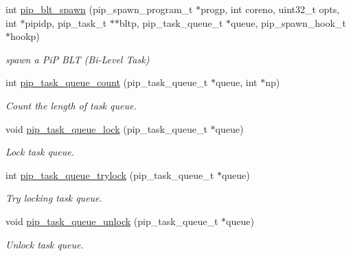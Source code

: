 \begin{DoxyCompactItemize}
\item 
int \hyperlink{group__libpip_gaceaa2ec686f001439d6ea89d47e71f65}{pip\-\_\-blt\-\_\-spawn} (pip\-\_\-spawn\-\_\-program\-\_\-t $\ast$progp, int coreno, uint32\-\_\-t opts, int $\ast$pipidp, pip\-\_\-task\-\_\-t $\ast$$\ast$bltp, pip\-\_\-task\-\_\-queue\-\_\-t $\ast$queue, pip\-\_\-spawn\-\_\-hook\-\_\-t $\ast$hookp)
\begin{DoxyCompactList}\small\item\em spawn a Pi\-P B\-L\-T (Bi-\/\-Level Task) \end{DoxyCompactList}\end{DoxyCompactItemize}
\begin{DoxyCompactItemize}
\item 
int \hyperlink{group__libpip_ga5a043af776eb89933bfc0a057790cc82}{pip\-\_\-task\-\_\-queue\-\_\-count} (pip\-\_\-task\-\_\-queue\-\_\-t $\ast$queue, int $\ast$np)
\begin{DoxyCompactList}\small\item\em Count the length of task queue. \end{DoxyCompactList}\end{DoxyCompactItemize}
\begin{DoxyCompactItemize}
\item 
void \hyperlink{group__libpip_gaf7f6e26e29752a148704108bdcc7756f}{pip\-\_\-task\-\_\-queue\-\_\-lock} (pip\-\_\-task\-\_\-queue\-\_\-t $\ast$queue)
\begin{DoxyCompactList}\small\item\em Lock task queue. \end{DoxyCompactList}\end{DoxyCompactItemize}
\begin{DoxyCompactItemize}
\item 
int \hyperlink{group__libpip_ga20d50746c585f1ede68f2c9aefc39a5c}{pip\-\_\-task\-\_\-queue\-\_\-trylock} (pip\-\_\-task\-\_\-queue\-\_\-t $\ast$queue)
\begin{DoxyCompactList}\small\item\em Try locking task queue. \end{DoxyCompactList}\end{DoxyCompactItemize}
\begin{DoxyCompactItemize}
\item 
void \hyperlink{group__libpip_gaf4cfe9905f1862718f65ba2fda961b84}{pip\-\_\-task\-\_\-queue\-\_\-unlock} (pip\-\_\-task\-\_\-queue\-\_\-t $\ast$queue)
\begin{DoxyCompactList}\small\item\em Unlock task queue. \end{DoxyCompactList}\end{DoxyCompactItemize}
